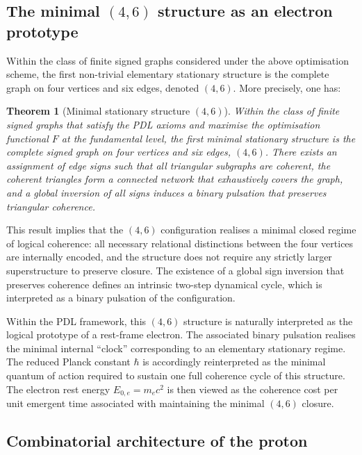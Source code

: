 \documentclass[11pt,a4paper]{article}
\newtheorem{theorem}{Theorem}
\begin{document}
\subsection{The minimal \texorpdfstring{$(4,6)$}{(4,6)} structure as an electron prototype}

Within the class of finite signed graphs considered under the above optimisation scheme, the first non-trivial elementary stationary structure is the complete graph on four vertices and six edges, denoted $(4,6)$.\cite{Laubscher2026IntroPDL,Laubscher2026PDL_English} More precisely, one has:

\begin{theorem}[Minimal stationary structure $(4,6)$]
Within the class of finite signed graphs that satisfy the PDL axioms and maximise the optimisation functional $F$ at the fundamental level, the first minimal stationary structure is the complete signed graph on four vertices and six edges, $(4,6)$. There exists an assignment of edge signs such that all triangular subgraphs are coherent, the coherent triangles form a connected network that exhaustively covers the graph, and a global inversion of all signs induces a binary pulsation that preserves triangular coherence.
\end{theorem}

This result implies that the $(4,6)$ configuration realises a minimal closed regime of logical coherence: all necessary relational distinctions between the four vertices are internally encoded, and the structure does not require any strictly larger superstructure to preserve closure.\cite{Laubscher2026IntroPDL} The existence of a global sign inversion that preserves coherence defines an intrinsic two-step dynamical cycle, which is interpreted as a binary pulsation of the configuration.\par Within the PDL framework, this $(4,6)$ structure is naturally interpreted as the logical prototype of a rest-frame electron.\cite{Laubscher2026PDL_English,Laubscher2026LDP_French} The associated binary pulsation realises the minimal internal ``clock'' corresponding to an elementary stationary regime. The reduced Planck constant $\hbar$ is accordingly reinterpreted as the minimal quantum of action required to sustain one full coherence cycle of this structure. The electron rest energy $E_{0,e}=m_e c^{2}$ is then viewed as the coherence cost per unit emergent time associated with maintaining the minimal $(4,6)$ closure.

\subsection{Combinatorial architecture of the proton}
\end{document}
